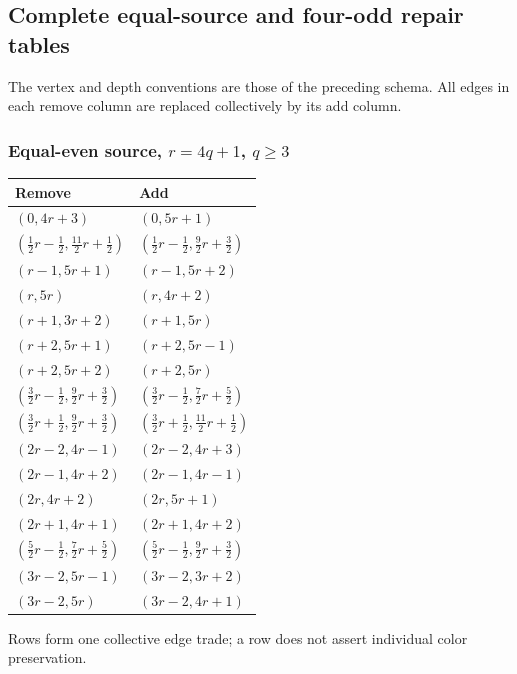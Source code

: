 \subsection{Complete equal-source and four-odd repair tables}
\label{templates:small-tables}
The vertex and depth conventions are those of the preceding schema. All edges in each remove column are replaced collectively by its add column.
\subsubsection[Equal-even source, r=4q+1, q >= 3]{Equal-even source, $r=4q+1$, $q\ge3$}
\label{templates:equal-r1}
\begingroup\small
\begin{longtable}{ll}
Remove & Add\\\hline\endhead
$(0,4r+3)$ & $(0,5r+1)$\\
$(\frac{1}{2}r-\frac{1}{2},\frac{11}{2}r+\frac{1}{2})$ & $(\frac{1}{2}r-\frac{1}{2},\frac{9}{2}r+\frac{3}{2})$\\
$(r-1,5r+1)$ & $(r-1,5r+2)$\\
$(r,5r)$ & $(r,4r+2)$\\
$(r+1,3r+2)$ & $(r+1,5r)$\\
$(r+2,5r+1)$ & $(r+2,5r-1)$\\
$(r+2,5r+2)$ & $(r+2,5r)$\\
$(\frac{3}{2}r-\frac{1}{2},\frac{9}{2}r+\frac{3}{2})$ & $(\frac{3}{2}r-\frac{1}{2},\frac{7}{2}r+\frac{5}{2})$\\
$(\frac{3}{2}r+\frac{1}{2},\frac{9}{2}r+\frac{3}{2})$ & $(\frac{3}{2}r+\frac{1}{2},\frac{11}{2}r+\frac{1}{2})$\\
$(2r-2,4r-1)$ & $(2r-2,4r+3)$\\
$(2r-1,4r+2)$ & $(2r-1,4r-1)$\\
$(2r,4r+2)$ & $(2r,5r+1)$\\
$(2r+1,4r+1)$ & $(2r+1,4r+2)$\\
$(\frac{5}{2}r-\frac{1}{2},\frac{7}{2}r+\frac{5}{2})$ & $(\frac{5}{2}r-\frac{1}{2},\frac{9}{2}r+\frac{3}{2})$\\
$(3r-2,5r-1)$ & $(3r-2,3r+2)$\\
$(3r-2,5r)$ & $(3r-2,4r+1)$\\
\end{longtable}
Rows form one collective edge trade; a row does not assert individual color preservation.
